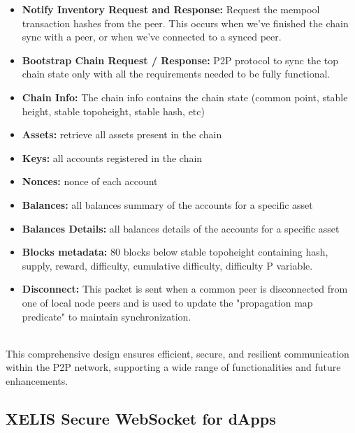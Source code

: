 \documentclass[12pt,a4paper,twocolumn]{article}
\begin{document}
\begin{itemize}
\item \textbf{Notify Inventory Request and Response:} Request the mempool transaction hashes from the peer. This occurs when we’ve finished the chain sync with a peer, or when we’ve connected to a synced peer.\\

\item \textbf{Bootstrap Chain Request / Response:} P2P protocol to sync the top chain state only with all the requirements needed to be fully functional.

\item \textbf{Chain Info:} The chain info contains the chain state (common point, stable height, stable topoheight, stable hash, etc)

\item \textbf {Assets:} retrieve all assets present in the chain

\item \textbf {Keys:} all accounts registered in the chain

\item \textbf {Nonces:} nonce of each account

\item \textbf {Balances:} all balances summary of the accounts for a specific asset

\item \textbf {Balances Details:} all balances details of the accounts for a specific asset

\item \textbf {Blocks metadata:} 80 blocks below stable topoheight containing hash, supply, reward, difficulty, cumulative difficulty, difficulty P variable.

\item \textbf{Disconnect:} This packet is sent when a common peer is disconnected from one of local node peers and is used to update the "propagation map predicate" to maintain synchronization.\\

\end{itemize}\\
This comprehensive design ensures efficient, secure, and resilient communication within the P2P network, supporting a wide range of functionalities and future enhancements.\\

\subsection{XELIS Secure WebSocket for dApps}
\end{document}
